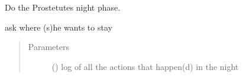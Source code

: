 \documentclass[letterpaper,10pt,english]{sphinxmanual}
\begin{document}
\begin{fulllineitems}
\begin{fulllineitems}
Do the Prostetutes night phase.

ask where (s)he wants to stay
\begin{quote}\begin{description}
\item[{Parameters}] \leavevmode
{} ({\hyperref[\detokenize{chatwolf:chatwolf.nightactions.Nightactions}]{}}) \textendash{} log of all the actions that happen(d) in the night

\end{description}\end{quote}

\end{fulllineitems}


\end{fulllineitems}
\end{document}

